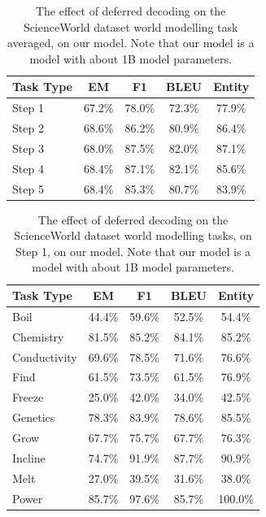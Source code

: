 \begin{table}[h]
\centering
    \setlength\tabcolsep{15pt}
    \setlength\extrarowheight{0pt}
\caption{The effect of deferred decoding on the ScienceWorld dataset \citep{wang-etal-2022-scienceworld} world modelling task averaged, on our model. Note that our model is a model with about 1B model parameters.}
\label{tab:scienceworld23}
\begin{tabular}{lcccc}
\toprule
\textbf{Task Type} & \textbf{EM} & \textbf{F1}
  & \textbf{BLEU} & \textbf{Entity}\\
\midrule
Step 1 & 67.2\% & 78.0\% & 72.3\% & 77.9\% \\
Step 2 & 68.6\% & 86.2\% & 80.9\% & 86.4\% \\
Step 3 & 68.0\% & 87.5\% & 82.0\% & 87.1\% \\
Step 4 & 68.4\% & 87.1\% & 82.1\% & 85.6\% \\
Step 5 & 68.4\% & 85.3\% & 80.7\% & 83.9\% \\

\bottomrule
\end{tabular}
\end{table}


\begin{table}[h]
\centering
    \setlength\tabcolsep{15pt}
    \setlength\extrarowheight{0pt}
\caption{The effect of deferred decoding on the ScienceWorld dataset \citep{wang-etal-2022-scienceworld} world modelling tasks, on Step 1, on our model. Note that our model is a model with about 1B model parameters.}
\label{tab:scienceworld24}
\begin{tabular}{lcccc}
\toprule
\textbf{Task Type} & \textbf{EM} & \textbf{F1}
  & \textbf{BLEU} & \textbf{Entity}\\
\midrule
Boil & 44.4\% & 59.6\% & 52.5\% & 54.4\% \\
Chemistry & 81.5\% & 85.2\% & 84.1\% & 85.2\% \\
Conductivity & 69.6\% & 78.5\% & 71.6\% & 76.6\% \\
Find & 61.5\% & 73.5\% & 61.5\% & 76.9\% \\
Freeze & 25.0\% & 42.0\% & 34.0\% & 42.5\% \\
Genetics & 78.3\% & 83.9\% & 78.6\% & 85.5\% \\
Grow & 67.7\% & 75.7\% & 67.7\% & 76.3\% \\
Incline & 74.7\% & 91.9\% & 87.7\% & 90.9\% \\
Melt & 27.0\% & 39.5\% & 31.6\% & 38.0\% \\
Power & 85.7\% & 97.6\% & 85.7\% & 100.0\% \\

\bottomrule
\end{tabular}
\end{table}


